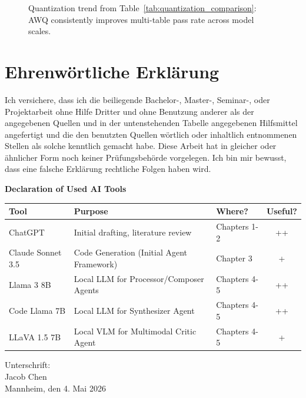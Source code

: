 \documentclass[a4paper,oneside,bibliography=totoc]{scrbook}
\begin{document}
\begin{figure}[h!]
\centering
{}
\caption{Quantization trend from Table~\ref{tab:quantization_comparison}: AWQ consistently improves multi-table pass rate across model scales.}
\label{fig:appendix_quantization_trend}
\end{figure}

\chapter{Ehrenwörtliche Erklärung}

Ich versichere, dass ich die beiliegende Bachelor-, Master-, Seminar-, oder
Projektarbeit ohne Hilfe Dritter und ohne Benutzung anderer als der angegebenen
Quellen und in der untenstehenden Tabelle angegebenen Hilfsmittel angefertigt
und die den benutzten Quellen wörtlich oder inhaltlich entnommenen Stellen als
solche kenntlich gemacht habe. Diese Arbeit hat in gleicher oder ähnlicher Form
noch keiner Prüfungsbehörde vorgelegen. Ich bin mir bewusst, dass eine falsche
Erklärung rechtliche Folgen haben wird.

\begin{center}
 \textbf{Declaration of Used AI Tools} \\[.3em]
 \begin{tabularx}{\textwidth}{lXlc}
 \toprule
 Tool & Purpose & Where? & Useful? \\
 \midrule
 ChatGPT & Initial drafting, literature review & Chapters 1-2 & ++ \\
 Claude Sonnet 3.5 & Code Generation (Initial Agent Framework) & Chapter 3 & + \\
 Llama 3 8B & Local LLM for Processor/Composer Agents & Chapters 4-5 & ++ \\
 Code Llama 7B & Local LLM for Synthesizer Agent & Chapters 4-5 & ++ \\
 LLaVA 1.5 7B & Local VLM for Multimodal Critic Agent & Chapters 4-5 & + \\
 \bottomrule
 \end{tabularx}
\end{center}

\vspace{2cm}
\noindent Unterschrift:\\
\noindent Jacob Chen\\
\noindent Mannheim, den 4. Mai 2026 \hfill
\end{document}

